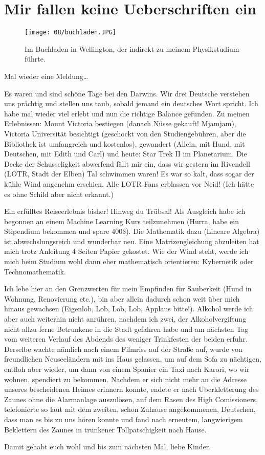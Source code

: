 \chapter{Mir fallen keine Ueberschriften ein}

\begin{wrapfigure}[17]{r}{0.3\textwidth}
  \centering
  \texttt{[image: 08/buchladen.JPG]}
  \caption*{Im Buchladen in Wellington, der indirekt zu meinem Physikstudium f\"uhrte.}
\end{wrapfigure}
Mal wieder eine Meldung\ldots{}

Es waren und sind schöne Tage bei den Darwins. Wir drei Deutsche
verstehen uns prächtig und stellen uns taub, sobald jemand ein
deutsches Wort spricht. Ich habe mal wieder viel erlebt und nun die
richtige Balance gefunden. Zu meinen Erlebnissen: Mount Victoria
bestiegen (danach Nüsse gekauft! Mjamjam), Victoria Universität
besichtigt (geschockt von den Studiengebühren, aber die Bibliothek ist
umfangreich und kostenlos), gewandert (Allein, mit Hund, mit
Deutschen, mit Edith und Carl) und heute: Star Trek II im
Planetarium. Die Decke der Schusseligkeit abwerfend fällt mir ein,
dass wir gestern im Rivendell (LOTR, Stadt der Elben) Tal schwimmen
waren! Es war so kalt, dass sogar der kühle Wind angenehm
erschien. Alle LOTR Fans erblassen vor Neid!  (Ich hätte es ohne
Schild aber nicht erkannt.)

Ein erfülltes Reiseerlebnis bisher! Hinweg du Trübsal! Als Ausgleich
habe ich begonnen an einem Machine Learning Kurs teilzunehmen (Hurra,
habe ein Stipendium bekommen und spare 400\$). Die Mathematik dazu
(Lineare Algebra) ist abwechslungsreich und wunderbar neu. Eine
Matrizengleichung abzuleiten hat mich trotz Anleitung 4 Seiten Papier
gekostet. Wie der Wind steht, werde ich mich beim Studium wohl dann eher
mathematisch orientieren: Kybernetik oder Technomathematik.

Ich lebe hier an den Grenzwerten für mein Empfinden für Sauberkeit (Hund
in Wohnung, Renovierung etc.), bin aber allein dadurch schon weit über
mich hinaus gewachsen (Eigenlob, Lob, Lob, Lob, Applaus bitte!). Alkohol
werde ich aber auch weiterhin nicht anrühren, nachdem ich zwei, der
Alkoholvergiftung nicht allzu ferne Betrunkene in die Stadt gefahren
habe und am nächsten Tag vom weiteren Verlauf des Abdends des weniger
Trinkfesten der beiden erfuhr. Derselbe wachte nämlich nach einem
Filmriss auf der Straße auf, wurde von freundlichen Neuseeländern mit
ins Haus gelassen, um auf dem Sofa zu nächtigen, entfloh aber wieder, um
dann von einem Spanier ein Taxi nach Karori, wo wir wohnen, spendiert zu
bekommen. Nachdem er sich nicht mehr an die Adresse unseres bescheidenen
Heimes erinnern konnte, endete er nach Überkletterung des Zaunes ohne
die Alarmanlage auszulösen, auf dem Rasen des High Comissioners,
telefonierte so laut mit dem zweiten, schon Zuhause angekommenen,
Deutschen, dass man es bis zu uns hören konnte und fand nach erneutem,
langwierigem Beklettern des Zaunes in trunkener Tollpatschigkeit nach
Hause.

Damit gehabt euch wohl und bis zum nächsten Mal, liebe Kinder.
